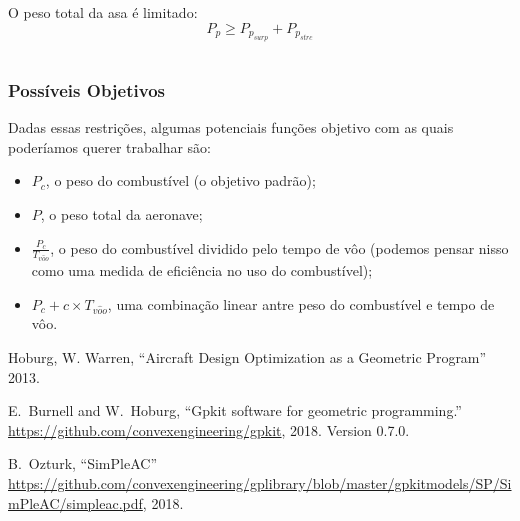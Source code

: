 \documentclass{article}
\begin{document}
O peso total da asa é limitado:
\[
  P_p \geq P_{p_{surp}} + P_{p_{strc}}
\]

\inputminted{python}{../Exemplos/Cap15/prog4_wwb.py}

\subsubsection{Possíveis Objetivos}

Dadas essas restrições, algumas potenciais funções objetivo com as
quais poderíamos querer trabalhar são:

\begin{itemize}
\item $P_c$, o peso do combustível (o objetivo padrão);
\item $P$, o peso total da aeronave;
\item $\frac{P_c}{T_{v\hat{o}o}}$, o peso do combustível dividido
  pelo tempo de vôo (podemos pensar nisso como uma medida de
  eficiência no uso do combustível);
\item $P_c + c \times T_{v\hat{o}o}$, uma combinação linear antre
  peso do combustível e tempo de vôo.
\end{itemize}


    \begin{thebibliography}{1}

        Hoburg, W. Warren,
        ``Aircraft Design Optimization as a Geometric Program''
        2013.

        E.~Burnell and W.~Hoburg, ``Gpkit software for geometric
        programming.''
        \url{https://github.com/convexengineering/gpkit}, 2018.
        \newblock Version 0.7.0.

        B.~Ozturk, ``SimPleAC''
        \url{https://github.com/convexengineering/gplibrary/blob/master/gpkitmodels/SP/SimPleAC/simpleac.pdf}, 2018.

        
      \end{thebibliography}
\end{document}
